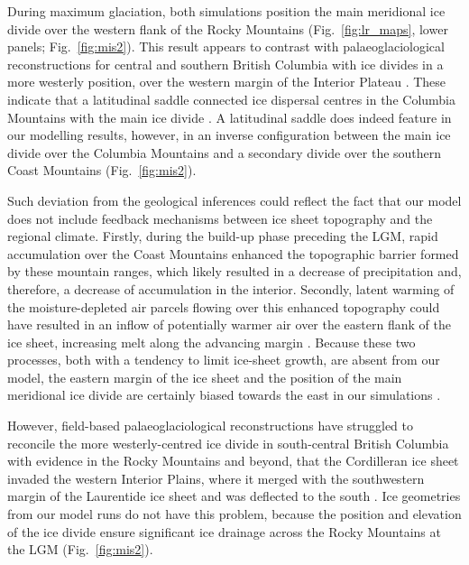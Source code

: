 \documentclass[tc, manuscript]{copernicus}
\begin{document}
During maximum glaciation, both simulations position the main meridional ice
divide over
the western flank of the Rocky Mountains (Fig.~\ref{fig:lr_maps}, lower
panels; Fig.~\ref{fig:mis2}). This result appears to contrast with
palaeoglaciological reconstructions for central and southern British Columbia
with ice divides in a more westerly position,
over the western margin of the Interior Plateau \citep{Ryder.etal.1991,
Stumpf.etal.2000, Kleman.etal.2010, Clague.Ward.2011, Margold.etal.2013a}.
These indicate that a latitudinal saddle connected ice dispersal centres in
the Columbia Mountains with the main ice divide \citep{Ryder.etal.1991,
Kleman.etal.2010, Clague.Ward.2011, Margold.etal.2013a}. A latitudinal saddle
does indeed feature in our modelling results, however, in an inverse
configuration between the main ice divide over the Columbia Mountains and a
secondary divide over the southern Coast Mountains (Fig.~\ref{fig:mis2}).

Such deviation from the geological inferences could reflect the fact that our
model does not include
feedback mechanisms between ice sheet topography and the regional climate.
Firstly, during the build-up phase preceding the LGM, rapid accumulation over
the Coast Mountains enhanced the topographic barrier formed by these mountain
ranges, which likely resulted in a decrease of precipitation and, therefore,
a decrease of
accumulation in the interior. Secondly, latent warming of the moisture-depleted
air parcels flowing over this enhanced topography could have resulted in an
inflow of potentially warmer air over the eastern flank of the ice sheet,
increasing melt
along the advancing margin \citep[cf.][]{Langen.etal.2012}. Because these two
processes, both with a tendency to limit ice-sheet growth, are absent from
our model, the
eastern margin of the ice sheet and the position of the main meridional ice
divide are certainly biased towards the east in our simulations
\citep{Seguinot.etal.2014}.

However, field-based palaeoglaciological reconstructions have
struggled to reconcile the more westerly-centred ice divide in south-central
British Columbia with evidence in the Rocky Mountains and beyond, that the
Cordilleran ice sheet invaded the western Interior Plains, where it merged with
the southwestern margin of the Laurentide ice sheet and was deflected to the
south \citep{Jackson.etal.1997, Bednarski.Smith.2007, Kleman.etal.2010,
Margold.etal.2013, Margold.etal.2013a}. Ice geometries from our model runs do
not have this problem, because the position and elevation of the ice divide
ensure significant ice drainage across the Rocky Mountains at the LGM
(Fig.~\ref{fig:mis2}).
\end{document}
